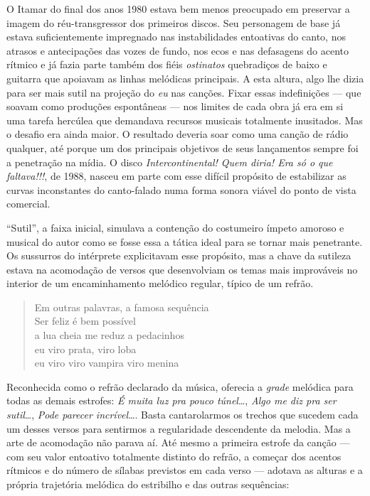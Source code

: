 O Itamar do final dos anos 1980 estava bem menos preocupado em preservar
a imagem do réu-transgressor dos primeiros discos. Seu personagem de
base já estava suficientemente impregnado nas instabilidades entoativas
do canto, nos atrasos e antecipações das vozes de fundo, nos ecos e nas
defasagens do acento rítmico e já fazia parte também dos fiéis \textit{ostinatos}
quebradiços de baixo e guitarra que apoiavam as linhas melódicas
principais. A esta altura, algo lhe dizia para ser mais sutil na
projeção do \textit{eu} nas canções. Fixar essas indefinições --- que soavam
como produções espontâneas --- nos limites de cada obra já era em si uma
tarefa hercúlea que demandava recursos musicais totalmente inusitados.
Mas o desafio era ainda maior. O resultado deveria soar como uma canção
de rádio qualquer, até porque um dos principais objetivos de seus
lançamentos sempre foi a penetração na mídia. O disco \textit{Intercontinental!
Quem diria! Era só o que faltava!!!}, de 1988, nasceu em parte com esse
difícil propósito de estabilizar as curvas inconstantes do canto-falado
numa forma sonora viável do ponto de vista comercial.

``Sutil'', a faixa inicial, simulava a contenção do costumeiro ímpeto
amoroso e musical do autor como se fosse essa a tática ideal para se
tornar mais penetrante. Os sussurros do intérprete explicitavam esse
propósito, mas a chave da sutileza estava na acomodação de versos que
desenvolviam os temas mais improváveis no interior de um encaminhamento
melódico regular, típico de um refrão.

\begin{verse}
\small{Em outras palavras, a famosa sequência\\
Ser feliz é bem possível\\
a lua cheia me reduz a pedacinhos\\
eu viro prata, viro loba\\
eu viro viro vampira viro menina}
\end{verse}

Reconhecida como o refrão declarado da música, oferecia a \textit{grade}
melódica para todas as demais estrofes: \textit{É muita luz pra pouco
túnel}\ldots, \textit{Algo me diz pra ser sutil}\ldots, \textit{Pode parecer
incrível}\ldots. Basta cantarolarmos os trechos que sucedem cada um desses
versos para sentirmos a regularidade descendente da melodia. Mas a arte
de acomodação não parava aí. Até mesmo a primeira estrofe da canção ---
com seu valor entoativo totalmente distinto do refrão, a começar dos
acentos rítmicos e do número de sílabas previstos em cada verso ---
adotava as alturas e a própria trajetória melódica do estribilho e das
outras sequências:

